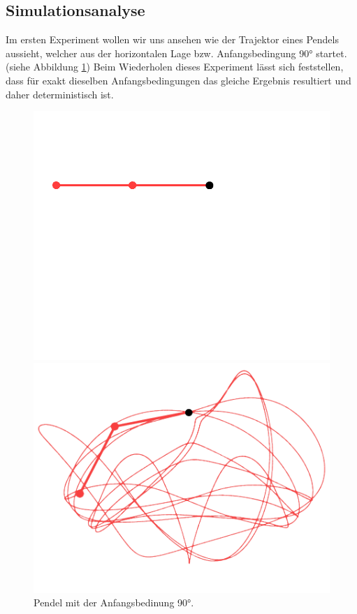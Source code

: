 \subsection{Simulationsanalyse}
Im ersten Experiment wollen wir uns ansehen wie der Trajektor eines Pendels aussieht,
welcher aus der horizontalen Lage bzw. Anfangsbedingung 90° startet.
(siehe Abbildung \ref{fig:pendel_bei_90})
Beim Wiederholen dieses Experiment lässt sich feststellen, dass für exakt dieselben Anfangsbedingungen
das gleiche Ergebnis resultiert und daher deterministisch ist.
\begin{figure}
    \centering
    \begin{minipage}{0.45\textwidth}
        \centering
        \includegraphics[width=\textwidth]{papers/doppelpendel/images/pendel_stand_90.png}
    \end{minipage}
    \hfill
    \begin{minipage}{0.45\textwidth}
        \centering
        \includegraphics[width=\textwidth]{papers/doppelpendel/images/pendel_spur_90.png}
    \end{minipage}
    \caption{Pendel mit der Anfangsbedinung 90°.}
    \label{fig:pendel_bei_90}
\end{figure}

